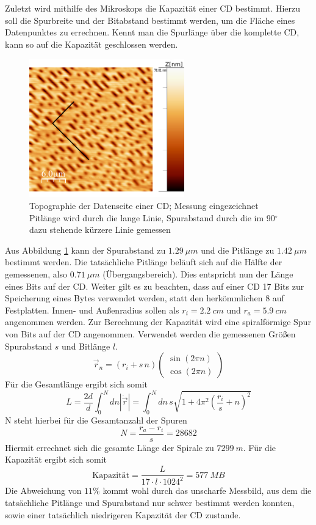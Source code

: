 Zuletzt wird mithilfe des Mikroskops die Kapazität einer CD bestimmt. Hierzu
soll die Spurbreite und der Bitabstand bestimmt werden, um die Fläche eines 
Datenpunktes zu errechnen. Kennt man die Spurlänge über die komplette CD, kann so auf die Kapazität 
geschlossen werden. \par
\begin{figure}
    \centering
    \includegraphics[width=0.6\textwidth]{Mess/cd_paint.png}
    \caption{Topographie der Datenseite einer CD; Messung eingezeichnet
             Pitlänge wird durch die lange Linie, Spurabstand durch die
             im 90$^\circ$ dazu stehende kürzere Linie gemessen}
    \label{cd}
\end{figure}
Aus Abbildung \ref{cd} kann der Spurabstand zu $\SI{1,29}{\mu m}$ und die
Pitlänge zu $\SI{1,42}{\mu m}$ bestimmt werden. 
Die tatsächliche Pitlänge beläuft sich auf die Hälfte der gemessenen, also
$\SI{0,71}{\mu m}$ (Übergangsbereich). Dies entspricht nun der Länge eines
Bits auf der CD. Weiter gilt es zu beachten, dass auf einer CD 17 Bits zur
Speicherung eines Bytes verwendet werden, statt den herkömmlichen 8 auf 
Festplatten. Innen- und Außenradius sollen als $r_i = \SI{2,2}{cm}$ und 
$r_a = \SI{5,9}{cm}$ angenommen werden. 
\vspace{6pt}
Zur Berechnung der Kapazität wird eine spiralförmige Spur von Bits auf der CD
angenommen. Verwendet werden die gemessenen Größen Spurabstand $s$ und 
Bitlänge $l$.
\[
    \vec{r}_n = (r_i+s \, n) 
        \begin{pmatrix}
            \sin(2\pi n)\\
            \cos(2\pi n)
        \end{pmatrix}
\]
Für die Gesamtlänge ergibt sich somit
\[
    L = \frac{2d}{d} \int_0^N dn | \dot{\vec{r}} | = \int_0^N dn \, s
        \sqrt{1 + 4 \pi^2 \left( \frac{r_i}{s} + n \right)^2} 
\]
N steht hierbei für die Gesamtanzahl der Spuren
\[
    N = \frac{r_a - r_i}{s} = 28682
\]
Hiermit errechnet sich die gesamte Länge der Spirale zu $\SI{7299}{m}$.
Für die Kapazität ergibt sich somit
\[
    \text{Kapazität} = \frac{L}{17 \cdot l \cdot 1024^2} = \SI{577}{MB}
\]
Die Abweichung von $11 \%$ kommt wohl durch das unscharfe Messbild, aus
dem die tatsächliche Pitlänge und Spurabstand nur schwer bestimmt werden konnten,
sowie einer tatsächlich niedrigeren Kapazität der CD zustande.
